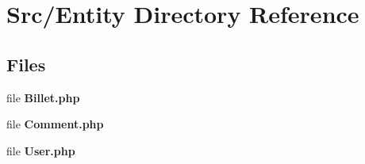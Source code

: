 \section{Src/\+Entity Directory Reference}
\label{dir_07ae240da7ea98c662d844069e42a581}
\subsection*{Files}
\begin{DoxyCompactItemize}
\item 
file \textbf{ Billet.\+php}
\item 
file \textbf{ Comment.\+php}
\item 
file \textbf{ User.\+php}
\end{DoxyCompactItemize}
